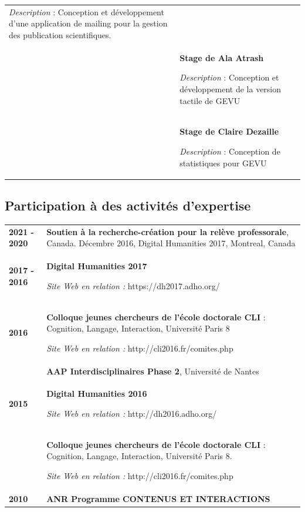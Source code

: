\documentclass[
  a4paper,
  DIV=11,
  numbers=noendperiod]{scrreprt}
\begin{document}
\begin{longtable}[]{@{}
  >{\raggedright\arraybackslash}p{}
  >{\raggedright\arraybackslash}p{}@{}}
\emph{Description} : Conception et développement d'une application de
mailing pour la gestion des publication scientifiques. \textbar{} \\
2012 & \textbf{Stage de Ala Atrash}

\emph{Description} : Conception et développement de la version tactile
de GEVU \textbar{} \\
2012 & \textbf{Stage de Claire Dezaille}

\emph{Description} : Conception de statistiques pour GEVU \textbar{} \\
\end{longtable}

\subsection{Participation à des activités
d'expertise}\label{participation-a-des-activites-dexpertise}

\begin{longtable}[]{@{}
  >{\raggedright\arraybackslash}p{}
  >{\raggedright\arraybackslash}p{}@{}}
\toprule\noalign{}
\endhead
\bottomrule\noalign{}
\endlastfoot
\textbf{2021 - 2020} & \textbf{Soutien à la recherche-création pour la
relève professorale}, Canada. Décembre 2016, Digital Humanities 2017,
Montreal, Canada \\
\textbf{2017 - 2016} & \textbf{Digital Humanities 2017}

\emph{Site Web en relation :} https://dh2017.adho.org/ \\
\textbf{2016} & \textbf{Colloque jeunes chercheurs de l'école doctorale
CLI} : Cognition, Langage, Interaction, Université Paris 8

\emph{Site Web en relation :} http://cli2016.fr/comites.php \\
& \textbf{AAP Interdisciplinaires Phase 2}, Université de Nantes \\
\textbf{2015} & \textbf{Digital Humanities 2016}

\emph{Site Web en relation :} http://dh2016.adho.org/ \\
& \textbf{Colloque jeunes chercheurs de l'école doctorale CLI} :
Cognition, Langage, Interaction, Université Paris 8.

\emph{Site Web en relation :} http://cli2016.fr/comites.php \\
\textbf{2010} & \textbf{ANR Programme CONTENUS ET INTERACTIONS} \\
\end{longtable}
\end{document}
